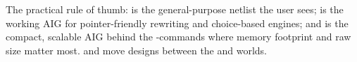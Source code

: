The practical rule of thumb:  is the general-purpose netlist the
user sees;  is the working AIG for pointer-friendly rewriting and
choice-based engines; and  is the compact, scalable AIG behind the
\cmd{\&}-commands where memory footprint and raw size matter most. 
and  move designs between the  and 
worlds.
